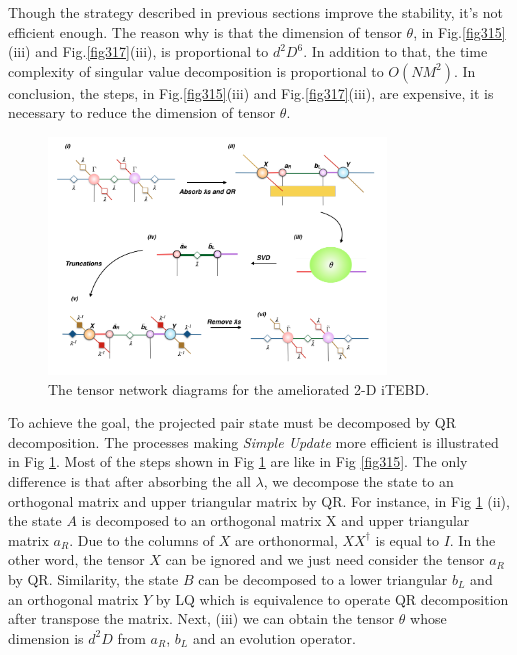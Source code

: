 Though the strategy described in previous sections improve the stability, it's not efficient enough. The reason why is that the dimension of tensor $\theta$, in Fig.\ref{fig315}(iii) and Fig.\ref{fig317}(iii), is proportional to $d^2D^6$. In addition to that, the time complexity of singular value decomposition is proportional to $O(NM^2)$. In conclusion, the steps, in Fig.\ref{fig315}(iii) and Fig.\ref{fig317}(iii), are expensive, it is necessary to reduce the dimension of tensor $\theta$. 
\label{2doptQR} \begin{figure}[H] \centering \includegraphics[width=0.80\textwidth]{figures/fig318.png} \caption[The tensor network diagrams for the ameliorated 2-D iTEBD with QR decompositiont]{The tensor network diagrams for the ameliorated 2-D iTEBD.} \label{fig318} \end{figure} To achieve the goal, the projected pair state must be decomposed by QR decomposition. The processes making \textit{Simple Update} more efficient is illustrated in Fig \ref{fig318}.  Most of the steps shown in Fig \ref{fig318} are like in Fig \ref{fig315}. The only difference is that after absorbing the all $\lambda$, we decompose the state to an orthogonal matrix and upper triangular matrix by QR. For instance, in Fig \ref{fig318} (ii), the state $A$ is decomposed to an orthogonal matrix X and upper triangular matrix $a_R$. Due to the columns of $X$ are orthonormal, $XX^{\dagger}$ is equal to $I$. In the other word, the tensor $X$ can be ignored and we just need consider the tensor $a_R$ by QR. Similarity, the state $B$ can be decomposed to a lower triangular $b_L$ and an orthogonal matrix $Y$ by LQ which is equivalence to operate QR decomposition after transpose the matrix. Next, (iii) we can obtain the tensor $\theta$ whose dimension is $d^2D$ from $a_R$, $b_L$ and an evolution operator.

